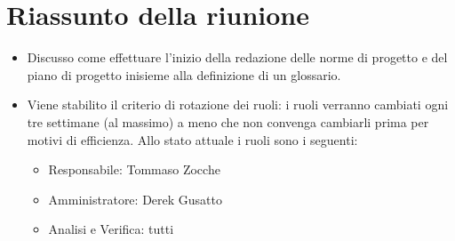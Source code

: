 \section{Riassunto della riunione}
\begin{itemize}
    \item Discusso come effettuare l'inizio della redazione delle norme di progetto e del piano di progetto inisieme alla definizione di un glossario.
    \item Viene stabilito il criterio di rotazione dei ruoli: i ruoli verranno cambiati ogni tre settimane (al massimo) a meno che non convenga cambiarli prima per motivi di efficienza.
    Allo stato attuale i ruoli sono i seguenti:
    \begin{itemize}
        \item Responsabile: Tommaso Zocche
        \item Amministratore: Derek Gusatto
        \item Analisi e Verifica: tutti
    \end{itemize}

\end{itemize}